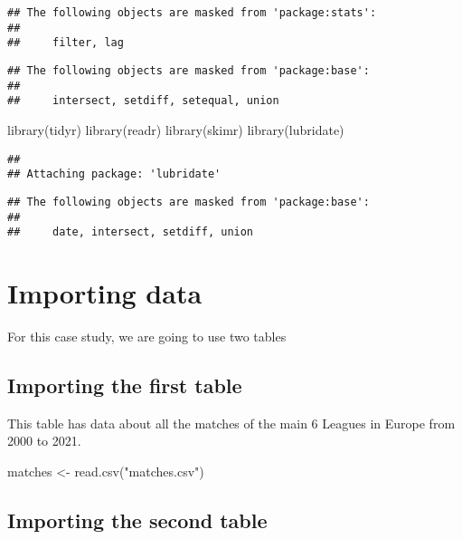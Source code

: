 \documentclass[
]{article}
\newenvironment{Shaded}{\begin{snugshade}}{\end{snugshade}}
\newcommand{\FunctionTok}[1]{\textcolor[rgb]{0.00,0.00,0.00}{#1}}
\newcommand{\NormalTok}[1]{#1}
\newcommand{\OtherTok}[1]{\textcolor[rgb]{0.56,0.35,0.01}{#1}}
\newcommand{\StringTok}[1]{\textcolor[rgb]{0.31,0.60,0.02}{#1}}
\begin{document}
\begin{verbatim}
## The following objects are masked from 'package:stats':
## 
##     filter, lag
\end{verbatim}

\begin{verbatim}
## The following objects are masked from 'package:base':
## 
##     intersect, setdiff, setequal, union
\end{verbatim}

\begin{Shaded}
\begin{Highlighting}[]
\FunctionTok{library}\NormalTok{(tidyr)}
\FunctionTok{library}\NormalTok{(readr)}
\FunctionTok{library}\NormalTok{(skimr)}
\FunctionTok{library}\NormalTok{(lubridate)}
\end{Highlighting}
\end{Shaded}

\begin{verbatim}
## 
## Attaching package: 'lubridate'
\end{verbatim}

\begin{verbatim}
## The following objects are masked from 'package:base':
## 
##     date, intersect, setdiff, union
\end{verbatim}

\hypertarget{importing-data}{%
\section{Importing data}\label{importing-data}}

For this case study, we are going to use two tables

\hypertarget{importing-the-first-table}{%
\subsection{Importing the first table}\label{importing-the-first-table}}

This table has data about all the matches of the main 6 Leagues in
Europe from 2000 to 2021.

\begin{Shaded}
\begin{Highlighting}[]
\NormalTok{matches }\OtherTok{\textless{}{-}} \FunctionTok{read.csv}\NormalTok{(}\StringTok{"matches.csv"}\NormalTok{)}
\end{Highlighting}
\end{Shaded}

\hypertarget{importing-the-second-table}{%
\subsection{Importing the second
table}\label{importing-the-second-table}}
\end{document}
